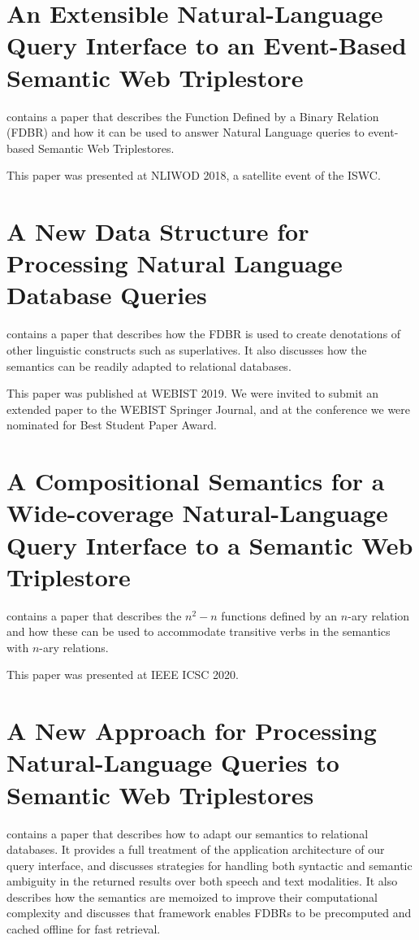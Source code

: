 \documentclass[../main.tex]{subfiles}
\begin{document}
\begin{refsection}
\section{An Extensible Natural-Language Query Interface to an Event-Based Semantic Web Triplestore}

\textbf{} contains a paper that describes the Function Defined by a Binary Relation (FDBR) and how it can be used to answer Natural Language queries to event-based Semantic Web Triplestores.

This paper was presented at NLIWOD 2018, a satellite event of the ISWC.

\section{A New Data Structure for Processing Natural Language Database Queries}

\textbf{} contains a paper that describes how the FDBR is used
to create denotations of other linguistic constructs such as superlatives.  It also discusses
how the semantics can be readily adapted to relational databases.

This paper was published at WEBIST 2019.  We were invited to submit an extended paper to the WEBIST Springer Journal, and at the conference we were nominated for Best Student Paper Award.

\section{A Compositional Semantics for a Wide-coverage Natural-Language Query Interface to a Semantic Web Triplestore}

\textbf{} contains a paper that describes the $n^2 - n$ functions defined by an $n$-ary relation and how these can be used to accommodate transitive verbs in the semantics with $n$-ary relations.

This paper was presented at IEEE ICSC 2020.

\section{A New Approach for Processing Natural-Language Queries to Semantic Web Triplestores}

\textbf{} contains a paper that describes how to adapt our semantics
to relational databases.  It provides a full treatment of the application architecture of our query interface, and discusses strategies for handling both syntactic and semantic ambiguity in the returned results over both speech and text modalities.  It also describes how the semantics are memoized to improve their computational complexity and discusses that framework enables FDBRs to be precomputed and cached offline for fast retrieval.


\end{refsection}
\end{document}
